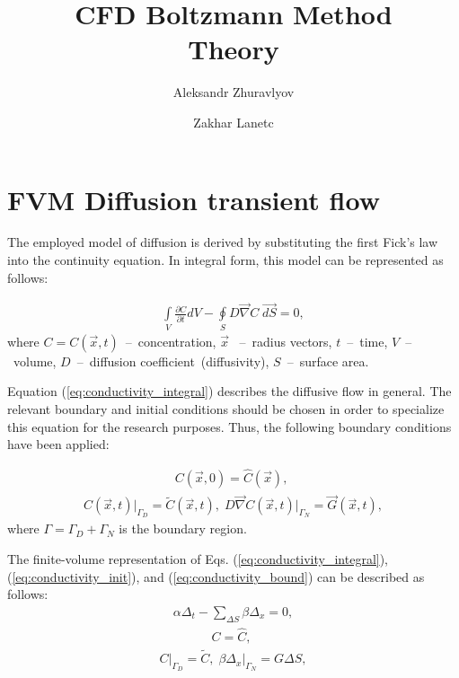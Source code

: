 \documentclass[a4paper,14pt,english]{extreport}
\author{Aleksandr Zhuravlyov \and Zakhar Lanetc}
\title{CFD Boltzmann Method\\Theory}
\date{\DTMnow}
\begin{document}
    \pagecolor{pageColor}
    \color{fontColor}

    \section*{FVM Diffusion transient flow}
    
The employed model of diffusion is derived by substituting the first Fick's law into the continuity equation. In integral form, this model can be represented as follows:

    \begin{eqnarray}
        \label{eq:conductivity_integral}
        \int \limits_{V} \frac{\partial C}{\partial t} d V - \oint \limits_{S} D \vec{\nabla}C \; \vec{dS} = 0,
    \end{eqnarray}
    where $C = C\left(\vec{x}, t\right)$~--~concentration, $\vec{x}$ ~--~radius vectors, $t$~--~time, $V$~--~volume, $D$~--~diffusion coefficient~(diffusivity), $S$~--~surface area.
    
Equation (\ref{eq:conductivity_integral}) describes the diffusive flow in general. The relevant boundary and initial conditions should be chosen in order to specialize this equation for the research purposes. Thus, the following boundary conditions have been applied:
    
    \begin{eqnarray}
        \label{eq:conductivity_init}
        C\left(\vec{x}, \mathit{0}\right) = \hat{C}\left(\vec{x}\right), \; 
     \end{eqnarray}
    \begin{eqnarray}
      \label{eq:conductivity_bound}
       C\left(\vec{x}, t\right)\Big|_{\mathit{\Gamma}_D} \!\!= \tilde{C}\left(\vec{x}, t\right), \; D \vec{\nabla}C \left(\vec{x}, t\right)\Big|_{\mathit{\Gamma}_N} \!\!= \vec{G}\left(\vec{x}, t\right),
    \end{eqnarray}
where $\mathit{\Gamma} = \mathit{\Gamma_D} + \mathit{\Gamma_N}$ is the boundary region.

The finite-volume representation of Eqs. (\ref{eq:conductivity_integral}), (\ref{eq:conductivity_init}), and (\ref{eq:conductivity_bound}) can be described as follows:
    \begin{eqnarray}
        \label{eq:conductivity_num}
        \alpha \Delta_{t} - \sum_{\Delta S} \beta\Delta_{x}= 0,
    \end{eqnarray}
    \begin{eqnarray}
         \label{eq:eq:conductivity_init_num}
        C = \hat{C}, \; 
    \end{eqnarray}
    \begin{eqnarray}
    \label{eq:eq:conductivity_bound_num}
      \label{eq:conductivity_bound_num}
    C \Big|_{\mathit{\Gamma}_D}= \tilde{C}, \; \beta\Delta_x \Big|_{\mathit{\Gamma}_N} = G\Delta S,
    \end{eqnarray}
\end{document}
